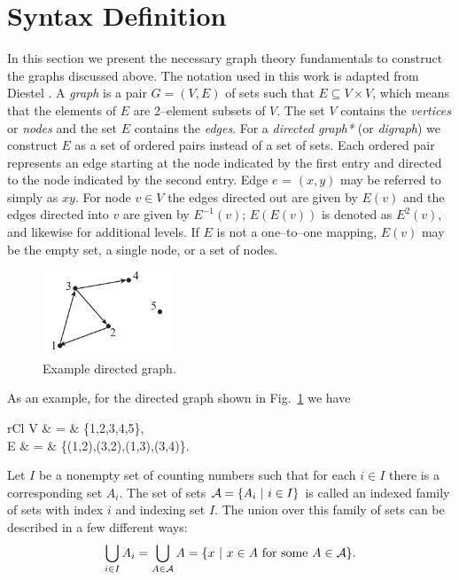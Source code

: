 \section{Syntax Definition}
	\label{s:syntax definition}
	In this section we present the necessary graph theory fundamentals to 
	construct the graphs discussed above. 
	The notation used in this work is adapted from Diestel \cite{Diestel2010}. 
	A \emph{graph} is a pair $G = (V,E)$ of sets such that $E \subseteq V \times V$, 
	which means that the elements of $E$ are 2--element subsets of $V$. The set $V$ 
	contains the \emph{vertices} or \emph{nodes} and the set $E$ contains the \emph{edges}.
	For a \emph{directed graph*} (or \emph{digraph}) we construct $E$ as a set of ordered pairs instead 
	of a set of sets. Each ordered pair represents an edge starting at the node 
	indicated by the first entry and directed to the node indicated by the second 
	entry. Edge $e$ = $(x,y)$ may be referred to simply as $xy$. For node $v \in V$ 
	the edges directed out are given by $E(v)$ and the edges directed into $v$ are given 
	by $E^{-1}(v)$; $E(E(v))$ is denoted as $E^2(v)$, and likewise for additional levels. 
	If $E$ is not a one--to--one mapping, $E(v)$ may be the empty set, a single node, or a set of nodes.
	\begin{figure}[htb!]
		\begin{center}
		\includegraphics[width=1.5in]{images/example_directed_graph}
		\end{center}
		\vspace{-20pt}
	\caption{Example directed graph.}
	\label{f:example directed graph}
	\end{figure}
	As an example, for the directed graph shown in Fig.~\ref{f:example directed graph} we have
	\begin{IEEEeqnarray*}{rCl}
	V & = & \{1,2,3,4,5\}, \\
	E & = & \big\{(1,2),(3,2),(1,3),(3,4)\big\}.
	\end{IEEEeqnarray*}

	Let $I$ be a nonempty set of counting numbers such that for each $i \in I$ there is a corresponding set $A_i$. 
	The set of sets $\mathcal A = \{A_i \ | \  i \in I\}$ is called an indexed family of sets with index $i$ and 
	indexing set $I$\cite{smith2006}. 
	The union over this family of sets can be described in a few different ways:
	\begin{equation}
	\bigcup_{i \in I} A_i = \bigcup_{A \in \mathcal A} A = \{x \ | \  x \in A \textrm{ for some } A \in \mathcal A\}.
	\end{equation}

